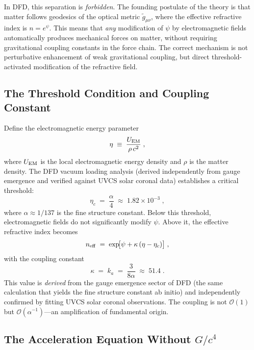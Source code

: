 \documentclass[twocolumn,prl,superscriptaddress,nofootinbib,longbibliography,floatfix]{revtex4-2}
\newcommand{\order}[1]{\mathcal{O}\!\left(#1\right)}
\begin{document}
In DFD, this separation is \emph{forbidden}.  The founding postulate of
the theory is that matter follows geodesics of the optical metric
$\tilde{g}_{\mu\nu}$, where the effective refractive index is
$n = e^\psi$.  This means that \emph{any} modification of $\psi$ by
electromagnetic fields automatically produces mechanical forces on
matter, without requiring gravitational coupling constants in the force
chain.  The correct mechanism is not perturbative enhancement of weak
gravitational coupling, but direct threshold-activated modification of
the refractive field.

\subsection{The Threshold Condition and Coupling Constant}\label{ssec:threshold-mechanism}

Define the electromagnetic energy parameter
\begin{equation}\label{eq:eta-def}
  \eta \;\equiv\; \frac{U_{\rm EM}}{\rho\, c^2} \;,
\end{equation}
where $U_{\rm EM}$ is the local electromagnetic energy density and $\rho$
is the matter density.  The DFD vacuum loading analysis (derived
independently from gauge emergence and verified against UVCS solar
coronal data) establishes a critical threshold:
\begin{equation}\label{eq:eta-c}
  \eta_c \;=\; \frac{\alpha}{4} \;\approx\; 1.82 \times 10^{-3} \;,
\end{equation}
where $\alpha \approx 1/137$ is the fine structure constant.  Below this
threshold, electromagnetic fields do not significantly modify $\psi$.
Above it, the effective refractive index becomes
\begin{equation}\label{eq:neff}
  n_{\rm eff} \;=\; \exp\!\bigl[\psi + \kappa\,(\eta - \eta_c)\bigr] \;,
\end{equation}
with the coupling constant
\begin{equation}\label{eq:kappa-threshold}
  \kappa \;=\; k_a \;=\; \frac{3}{8\alpha} \;\approx\; 51.4 \;.
\end{equation}
This value is \emph{derived} from the gauge emergence sector of DFD (the
same calculation that yields the fine structure constant ab initio) and
independently confirmed by fitting UVCS solar coronal observations.  The
coupling is not $\order{1}$ but $\order{\alpha^{-1}}$---an amplification
of fundamental origin.

\subsection{The Acceleration Equation Without $G/c^4$}\label{ssec:accel-no-G}
\end{document}
